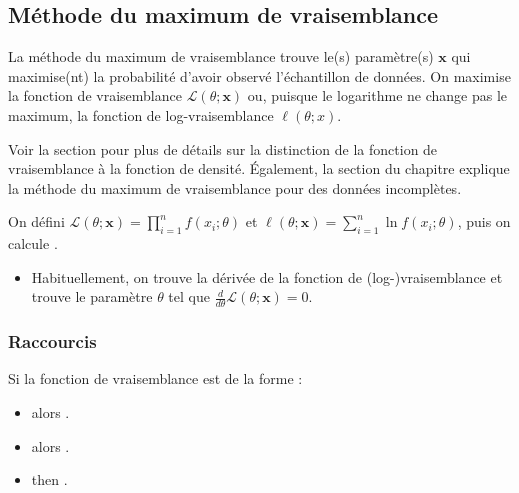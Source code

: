 \documentclass[french]{article}
\begin{document}
\begin{multicols*}{2}
\columnbreak
\subsection{Méthode du maximum de vraisemblance}\label{subsec:MLEConstruction}
\begin{rappel_enhanced}[Contexte]
La méthode du maximum de vraisemblance trouve le(s) paramètre(s) $\bm{x}$ qui maximise(nt) la probabilité d'avoir observé l'échantillon de données. On maximise la fonction de vraisemblance $\mathcal{L}(\theta; \bm{x})$  ou, puisque le logarithme ne change pas le maximum, la fonction de log-vraisemblance $\ell(\theta; x)$. 

\bigskip

Voir la section \underline{\textit{}} pour plus de détails sur la distinction de la fonction de vraisemblance à la fonction de densité. Également, la section \underline{\textit{}} du chapitre \underline{\textit{}} explique la méthode du maximum de vraisemblance pour des données incomplètes.
\end{rappel_enhanced}

\begin{definitionNOHFILL}
On défini $\mathcal{L}(\theta; \bm{x}) = \prod_{i = 1}^{n}	f(x_{i}; \theta)$ et $\ell(\theta; \bm{x}) = \sum_{i = 1}^{n} \ln	f(x_{i}; \theta)$, puis on calcule .

\begin{itemize}
	\item	Habituellement, on trouve la dérivée de la fonction de (log-)vraisemblance et trouve le paramètre $\theta$ tel que $\frac{d}{d\theta}\mathcal{L}(\theta; \bm{x}) = 0$.
\end{itemize}
\end{definitionNOHFILL}



\subsubsection{Raccourcis}
Si la fonction de vraisemblance est de la forme :
\begin{itemize}
	\item	{} alors .
	\item	{} alors .
	\item	{} then .
\end{itemize}




\end{multicols*}
\end{document}
